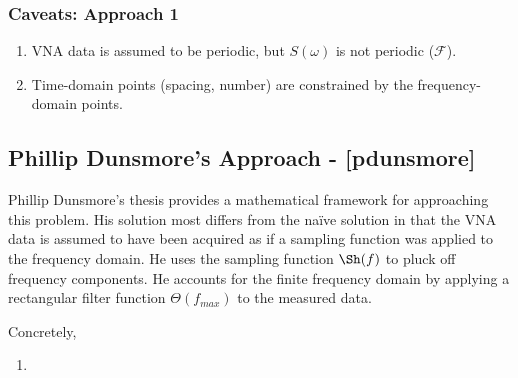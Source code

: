 \subsubsection{Caveats: Approach 1}
\label{sub:caveats_approach_1}

\begin{enumerate}
  \item VNA data is assumed to be periodic, but $ S(\omega) $ is not periodic
    ($\mathcal{F}$).
  \item Time-domain points (spacing, number) are constrained by the frequency-domain points.
\end{enumerate}

\subsection{Phillip Dunsmore's Approach - [pdunsmore]}
\label{sub:phillip_dunsmore_s_approach_pdunsmore_}

Phillip Dunsmore's thesis provides a mathematical framework for approaching this
problem. His solution most differs from the na\"{i}ve solution in that the VNA
data is assumed to have been acquired as if a sampling function was applied to
the frequency domain. He uses the sampling function $\Sh(f)$ to pluck off
frequency components. He accounts for the finite frequency domain by applying a
rectangular filter function $\Theta(f_{max})$ to the measured data.

Concretely,

\begin{enumerate}
  \item
\end{enumerate}
